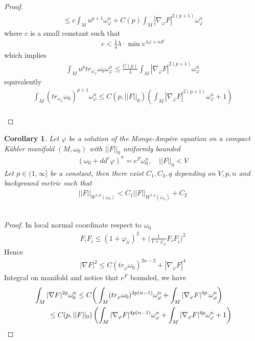 \documentclass[11pt]{amsart}
\newtheorem{cor}[lem]{Corollary}
\numberwithin{equation}{section}
\begin{document}
\begin{proof}
\begin{align}
	\le  c \int_M u^{p+1}\omega_\varphi^n +C(p) \int_M |\nabla_\varphi F|^{2(p+1)}\omega_\varphi^n
\end{align} 
where $c$ is a small constant such that 
\begin{align}
	c < \frac{1}{4} \lambda\cdot \min e^{\lambda\varphi+\alpha F}
\end{align}
which implies 
\begin{align}
	\int_M u^p tr_{\omega_{\varphi}}\omega_0 \omega_\varphi^n \le  \frac{C(p)}{\lambda} \int_M |\nabla_\varphi F|^{2(p+1)}\omega_\varphi^n
\end{align}
equivalently 
\begin{align}
	\int_M (tr_{\omega_{\varphi}}\omega_0)^{p+1}\omega_\varphi^n \le  C(p,||F||_0)\left( \int_M |\nabla_\varphi F|^{2(p+1)}\omega_\varphi^n +1 \right)
\end{align}\\
\end{proof}





\begin{cor}\label{Lem32}
	Let $\varphi$ be a solution of the Monge-Amp\'ere equation on a compact K\"ahler manifold $(M,\omega_0)$ with $||F||_0$ uniformly bounded  
	\begin{align}
		(\omega_0+dd^c \varphi)^n=e^F \omega_0^n, \quad ||F||_0< V
	\end{align}
	Let $p\in (1,\infty]$ be a constant, then there exist $C_1, C_2,q$ depending on $V,p,n$ and background metric such that 
	\begin{align}
		||F||_{W^{1,p}(\omega_0)} < C_1 ||F||_{W^{1,q}(\omega_\varphi)} +C_2
	\end{align}\\
\end{cor}


\begin{proof}
	In local normal coordinate respect to $\omega_0$
	\begin{align}
		F_{i}F_{\bar i} \le  (1+\varphi_{i\bar i})^2 + \bigg( \frac{1}{1+\varphi_{i\bar i}} F_{i}F_{\bar i} \bigg)^2
	\end{align}
	Hence 
	\begin{align}
		|\nabla F|^2\le  C (tr_\varphi \omega_0)^{2n-2} + |\nabla_\varphi F|^4
	\end{align} 
	Integral on manifold  and notice that $e^F$ bounded, we have 
	\begin{align}
		& \int_M |\nabla F|^{2p}\omega_0^n \le  C \bigg( \int_M (tr_\varphi \omega_0)^{2p(n-1)}\omega_\varphi^n + \int_M |\nabla_\varphi F|^{4p}\, \omega_\varphi^n \bigg) \notag\\
		& \qquad \le  C(p,||F||_0)\left( \int_M |\nabla_\varphi F|^{4p(n-1)}\omega_\varphi^n +  \int_M |\nabla_\varphi F|^{4p}\omega_\varphi^n +1 \right)
	\end{align}
\end{proof}
\end{document}
